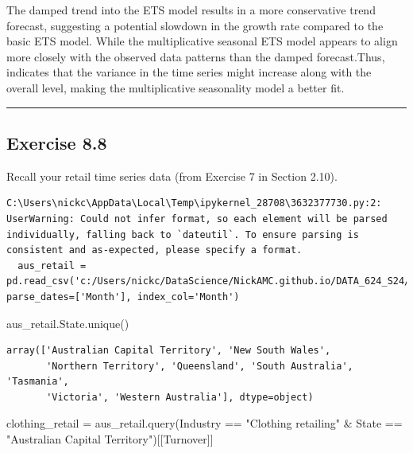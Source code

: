 \documentclass[
  11pt,
]{article}
\newenvironment{Shaded}{\begin{snugshade}}{\end{snugshade}}
\newcommand{\NormalTok}[1]{\textcolor[rgb]{0.00,0.23,0.31}{#1}}
\newcommand{\OperatorTok}[1]{\textcolor[rgb]{0.37,0.37,0.37}{#1}}
\newcommand{\StringTok}[1]{\textcolor[rgb]{0.13,0.47,0.30}{#1}}
\begin{document}
The damped trend into the ETS model results in a more conservative trend
forecast, suggesting a potential slowdown in the growth rate compared to
the basic ETS model. While the multiplicative seasonal ETS model appears
to align more closely with the observed data patterns than the damped
forecast.Thus, indicates that the variance in the time series might
increase along with the overall level, making the multiplicative
seasonality model a better fit.

\begin{center}\rule{0.5\linewidth}{0.5pt}\end{center}

\subsection{Exercise 8.8}\label{exercise-8.8}

Recall your retail time series data (from Exercise 7 in Section 2.10).

\begin{verbatim}
C:\Users\nickc\AppData\Local\Temp\ipykernel_28708\3632377730.py:2: UserWarning: Could not infer format, so each element will be parsed individually, falling back to `dateutil`. To ensure parsing is consistent and as-expected, please specify a format.
  aus_retail = pd.read_csv('c:/Users/nickc/DataScience/NickAMC.github.io/DATA_624_S24/rdata/aus_retail.csv', parse_dates=['Month'], index_col='Month')
\end{verbatim}

\begin{Shaded}
\begin{Highlighting}[]
\NormalTok{aus\_retail.State.unique()}
\end{Highlighting}
\end{Shaded}

\begin{verbatim}
array(['Australian Capital Territory', 'New South Wales',
       'Northern Territory', 'Queensland', 'South Australia', 'Tasmania',
       'Victoria', 'Western Australia'], dtype=object)
\end{verbatim}

\begin{Shaded}
\begin{Highlighting}[]
\NormalTok{clothing\_retail }\OperatorTok{=}\NormalTok{ aus\_retail.query(}\StringTok{\textquotesingle{}Industry == "Clothing retailing" \& State == "Australian Capital Territory"\textquotesingle{}}\NormalTok{)[[}\StringTok{\textquotesingle{}Turnover\textquotesingle{}}\NormalTok{]]}
\end{Highlighting}
\end{Shaded}
\end{document}
